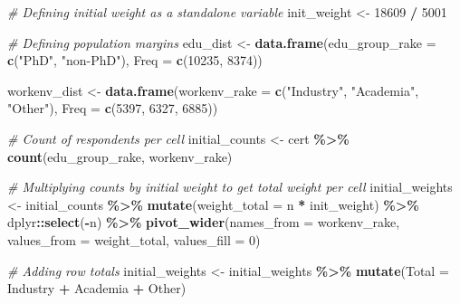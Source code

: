 \documentclass[]{article}
\newenvironment{Shaded}{\begin{snugshade}}{\end{snugshade}}
\newcommand{\AttributeTok}[1]{\textcolor[rgb]{0.13,0.29,0.53}{#1}}
\newcommand{\CommentTok}[1]{\textcolor[rgb]{0.56,0.35,0.01}{\textit{#1}}}
\newcommand{\DecValTok}[1]{\textcolor[rgb]{0.00,0.00,0.81}{#1}}
\newcommand{\FunctionTok}[1]{\textcolor[rgb]{0.13,0.29,0.53}{\textbf{#1}}}
\newcommand{\NormalTok}[1]{#1}
\newcommand{\OtherTok}[1]{\textcolor[rgb]{0.56,0.35,0.01}{#1}}
\newcommand{\SpecialCharTok}[1]{\textcolor[rgb]{0.81,0.36,0.00}{\textbf{#1}}}
\newcommand{\StringTok}[1]{\textcolor[rgb]{0.31,0.60,0.02}{#1}}
\begin{document}
\newpage
\begin{Shaded}
\begin{Highlighting}[]
\CommentTok{\# Defining initial weight as a standalone variable }
\NormalTok{init\_weight }\OtherTok{\textless{}{-}} \DecValTok{18609} \SpecialCharTok{/} \DecValTok{5001}

\CommentTok{\# Defining population margins }
\NormalTok{edu\_dist }\OtherTok{\textless{}{-}} \FunctionTok{data.frame}\NormalTok{(}\AttributeTok{edu\_group\_rake =} \FunctionTok{c}\NormalTok{(}\StringTok{"PhD"}\NormalTok{, }\StringTok{"non{-}PhD"}\NormalTok{),}
                       \AttributeTok{Freq =} \FunctionTok{c}\NormalTok{(}\DecValTok{10235}\NormalTok{, }\DecValTok{8374}\NormalTok{))}

\NormalTok{workenv\_dist }\OtherTok{\textless{}{-}} \FunctionTok{data.frame}\NormalTok{(}\AttributeTok{workenv\_rake =} \FunctionTok{c}\NormalTok{(}\StringTok{"Industry"}\NormalTok{, }\StringTok{"Academia"}\NormalTok{, }\StringTok{"Other"}\NormalTok{),}
                           \AttributeTok{Freq =} \FunctionTok{c}\NormalTok{(}\DecValTok{5397}\NormalTok{, }\DecValTok{6327}\NormalTok{, }\DecValTok{6885}\NormalTok{))}

\CommentTok{\# Count of respondents per cell}
\NormalTok{initial\_counts }\OtherTok{\textless{}{-}}\NormalTok{ cert }\SpecialCharTok{\%\textgreater{}\%}
  \FunctionTok{count}\NormalTok{(edu\_group\_rake, workenv\_rake)}

\CommentTok{\# Multiplying counts by initial weight to get total weight per cell }
\NormalTok{initial\_weights }\OtherTok{\textless{}{-}}\NormalTok{ initial\_counts }\SpecialCharTok{\%\textgreater{}\%}
  \FunctionTok{mutate}\NormalTok{(}\AttributeTok{weight\_total =}\NormalTok{ n }\SpecialCharTok{*}\NormalTok{ init\_weight) }\SpecialCharTok{\%\textgreater{}\%}
\NormalTok{  dplyr}\SpecialCharTok{::}\FunctionTok{select}\NormalTok{(}\SpecialCharTok{{-}}\NormalTok{n) }\SpecialCharTok{\%\textgreater{}\%}
  \FunctionTok{pivot\_wider}\NormalTok{(}\AttributeTok{names\_from =}\NormalTok{ workenv\_rake, }\AttributeTok{values\_from =}\NormalTok{ weight\_total, }\AttributeTok{values\_fill =} \DecValTok{0}\NormalTok{)}

\CommentTok{\# Adding row totals }
\NormalTok{initial\_weights }\OtherTok{\textless{}{-}}\NormalTok{ initial\_weights }\SpecialCharTok{\%\textgreater{}\%}
  \FunctionTok{mutate}\NormalTok{(}\AttributeTok{Total =}\NormalTok{ Industry }\SpecialCharTok{+}\NormalTok{ Academia }\SpecialCharTok{+}\NormalTok{ Other)}


\end{Highlighting}
\end{Shaded}
\end{document}
